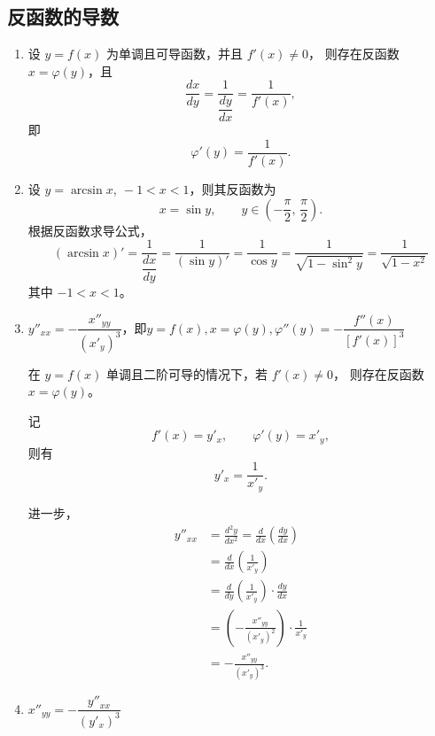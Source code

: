 \documentclass[../book.tex]{subfiles}
\begin{document}
    \subsection{反函数的导数}

    \begin{enumerate}
        \item 设 $y=f(x)$ 为单调且可导函数，并且 $f'(x)\neq 0$，
        则存在反函数 $x=\varphi(y)$，且
        \[
            \frac{dx}{dy}
            =
            \frac{1}{\dfrac{dy}{dx}}
            =
            \frac{1}{f'(x)},
        \]
        即
        \[
            \varphi'(y)=\frac{1}{f'(x)}.
        \]
        \item \begin{analysisbox}[Example]
                  设 $y = \arcsin x,\ -1 < x < 1$，则其反函数为
                  \[
                      x = \sin y,\qquad y \in \left(-\frac{\pi}{2},\,\frac{\pi}{2}\right).
                  \]
                  根据反函数求导公式，
                  \[
                      (\arcsin x)' = \frac{1}{\dfrac{dx}{dy}}
                      = \frac{1}{(\sin y)'}
                      = \frac{1}{\cos y}
                      = \frac{1}{\sqrt{1-\sin^2 y}}
                      = \frac{1}{\sqrt{1-x^2}}
                  \]
                  其中 $-1<x<1$。
        \end{analysisbox}
        \item $y''_{xx} = -\dfrac{x''_{yy}}{(x'_y)^3}$，即$y = f(x), x = \varphi (y), \varphi''(y) = -\dfrac{f''(x)}{[f'(x)]^3}$
        \begin{analysisbox}
            在 $y=f(x)$ 单调且二阶可导的情况下，若 $f'(x)\neq 0$，
            则存在反函数 $x=\varphi(y)$。

            记
            \[
                f'(x)=y'_x,\qquad \varphi'(y)=x'_y,
            \]
            则有
            \[
                y'_x=\frac{1}{x'_y}.
            \]

            进一步，
            \[
                \begin{aligned}
                    y''_{xx}
                    &=\frac{d^2y}{dx^2} = \frac{d}{dx}\!\left(\frac{dy}{dx}\right) \\[6pt]
                    &=\frac{d}{dx}\!\left(\frac{1}{x'_y}\right) \\[6pt]
                    &=\frac{d}{dy}\!\left(\frac{1}{x'_y}\right)\cdot\frac{dy}{dx} \\[6pt]
                    &=\left(-\frac{x''_{yy}}{(x'_y)^2}\right)\cdot\frac{1}{x'_y} \\[6pt]
                    &=-\frac{x''_{yy}}{(x'_y)^3}.
                \end{aligned}
            \]
        \end{analysisbox}
        \item $x''_{yy} = -\dfrac{y''_{xx}}{(y'_x)^3}$
    \end{enumerate}
\end{document}

